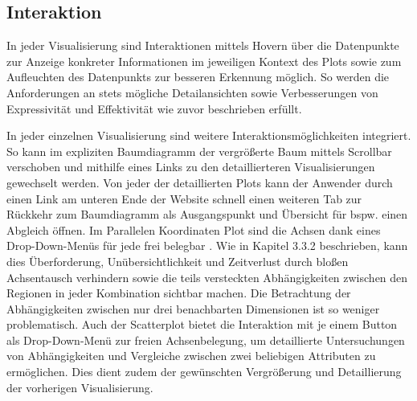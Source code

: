 \documentclass[usegeometry=true]{scrartcl}
\begin{document}


\subsection{Interaktion}
In jeder Visualisierung sind Interaktionen mittels Hovern über die Datenpunkte zur Anzeige konkreter Informationen im jeweiligen Kontext des Plots 
sowie zum Aufleuchten des Datenpunkts zur besseren Erkennung möglich.
So werden die Anforderungen an stets mögliche Detailansichten sowie Verbesserungen von Expressivität und Effektivität wie zuvor beschrieben erfüllt. 

In jeder einzelnen Visualisierung sind weitere Interaktionsmöglichkeiten integriert. 
So kann im expliziten Baumdiagramm der vergrößerte Baum mittels Scrollbar verschoben und mithilfe eines Links zu den detaillierteren Visualisierungen gewechselt werden.
Von jeder der detaillierten Plots kann der Anwender durch einen Link am unteren Ende der Website schnell einen weiteren Tab zur Rückkehr zum Baumdiagramm als Ausgangspunkt und Übersicht für bspw. einen Abgleich öffnen.
Im Parallelen Koordinaten Plot sind die Achsen dank eines Drop-Down-Menüs für jede frei belegbar . 
Wie in Kapitel 3.3.2 beschrieben, kann dies Überforderung, Unübersichtlichkeit und Zeitverlust durch bloßen Achsentausch verhindern 
sowie die teils versteckten Abhängigkeiten zwischen den Regionen in jeder Kombination sichtbar machen. 
Die Betrachtung der Abhängigkeiten zwischen nur drei benachbarten Dimensionen ist so weniger problematisch.
Auch der Scatterplot bietet die Interaktion mit je einem Button als Drop-Down-Menü zur freien Achsenbelegung, 
um detaillierte Untersuchungen von Abhängigkeiten und Vergleiche zwischen zwei beliebigen Attributen zu ermöglichen.
Dies dient zudem der gewünschten Vergrößerung und Detaillierung der vorherigen Visualisierung.
\end{document}
